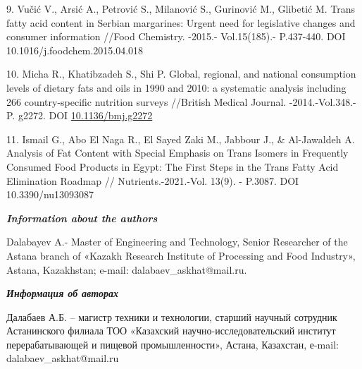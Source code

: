 \begin{references}
9. Vučić V., Arsić A., Petrović S., Milanović S., Gurinović M., Glibetić
M. Trans fatty acid content in Serbian margarines: Urgent need for
legislative changes and consumer information //Food Chemistry. -2015.-
Vol.15(185).- P.437-440. DOI 10.1016/j.foodchem.2015.04.018

10. Micha R., Khatibzadeh S., Shi P. Global, regional, and national
consumption levels of dietary fats and oils in 1990 and 2010: a
systematic analysis including 266 country-specific nutrition surveys
//British Medical Journal. -2014.-Vol.348.-P. g2272. DOI
\href{https://doi.org/10.1136/bmj.g2272}{10.1136/bmj.g2272}

11. Ismail G., Abo El Naga R., El Sayed Zaki M., Jabbour J., \&
Al-Jawaldeh A. Analysis of Fat Content with Special Emphasis on Trans
Isomers in Frequently Consumed Food Products in Egypt: The First Steps
in the Trans Fatty Acid Elimination Roadmap // Nutrients.-2021.-Vol.
13(9). - P.3087. DOI 10.3390/nu13093087
\end{references}

\begin{authorinfo}
\emph{{\bfseries Information about the authors}}

Dalabayev A.- Master of Engineering and Technology, Senior Researcher of
the Astana branch of «Kazakh Research Institute of Processing and Food
Industry», Astana, Kazakhstan; e-mail: dalabaev\_askhat@mail.ru.

\emph{{\bfseries Информация об авторах}}

Далабаев А.Б. -- магистр техники и технологии, старший научный сотрудник
Астанинского филиала ТОО «Казахский научно-исследовательский институт
перерабатывающей и пищевой промышленности», Астана, Казахстан, е-mail:
dalabaev\_askhat@mail.ru
\end{authorinfo}
